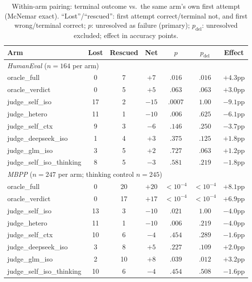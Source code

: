 \documentclass[10pt]{article}
\begin{document}
\begin{table}[t]
\centering\small
\caption{Within-arm pairing: terminal outcome vs.\ the same arm's
own first attempt (McNemar exact).  ``Lost''/``rescued'': first
attempt correct/terminal not, and first wrong/terminal correct;
$p$: unresolved as failure (primary); $p_{\mathrm{del}}$:
unresolved excluded; effect in accuracy points.}
\label{tab:within}
\begin{tabular}{lcccccc}
\toprule
Arm & Lost & Rescued & Net & $p$ & $p_{\mathrm{del}}$ & Effect\\
\midrule
\multicolumn{7}{l}{\emph{HumanEval} ($n{=}164$ per arm)}\\
oracle\_full & 0 & 7 & $+7$ & $.016$ & $.016$ & $+4.3$pp\\
oracle\_verdict & 0 & 5 & $+5$ & $.063$ & $.063$ & $+3.0$pp\\
judge\_self\_iso & 17 & 2 & $-15$ & $.0007$ & $1.00$ & $-9.1$pp\\
judge\_hetero & 11 & 1 & $-10$ & $.006$ & $.625$ & $-6.1$pp\\
judge\_self\_ctx & 9 & 3 & $-6$ & $.146$ & $.250$ & $-3.7$pp\\
judge\_deepseek\_iso & 1 & 4 & $+3$ & $.375$ & $.125$ & $+1.8$pp\\
judge\_glm\_iso & 3 & 5 & $+2$ & $.727$ & $.063$ & $+1.2$pp\\
judge\_self\_iso\_thinking & 8 & 5 & $-3$ & $.581$ & $.219$ & $-1.8$pp\\
\midrule
\multicolumn{7}{l}{\emph{MBPP} ($n{=}247$ per arm; thinking
control $n{=}245$)}\\
oracle\_full & 0 & 20 & $+20$ & $<10^{-4}$ & $<10^{-4}$ & $+8.1$pp\\
oracle\_verdict & 0 & 17 & $+17$ & $<10^{-4}$ & $<10^{-4}$ & $+6.9$pp\\
judge\_self\_iso & 13 & 3 & $-10$ & $.021$ & $1.00$ & $-4.0$pp\\
judge\_hetero & 11 & 1 & $-10$ & $.006$ & $.219$ & $-4.0$pp\\
judge\_self\_ctx & 10 & 6 & $-4$ & $.454$ & $.289$ & $-1.6$pp\\
judge\_deepseek\_iso & 3 & 8 & $+5$ & $.227$ & $.109$ & $+2.0$pp\\
judge\_glm\_iso & 2 & 10 & $+8$ & $.039$ & $.012$ & $+3.2$pp\\
judge\_self\_iso\_thinking & 10 & 6 & $-4$ & $.454$ & $.508$ & $-1.6$pp\\
\bottomrule
\end{tabular}
\end{table}
\end{document}
